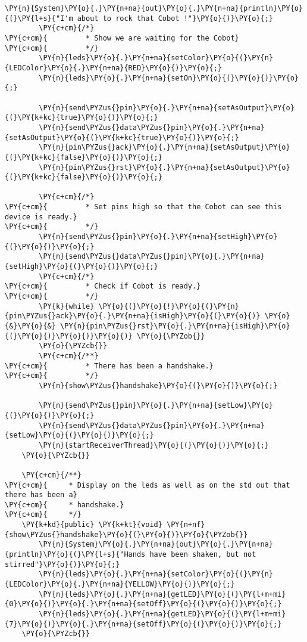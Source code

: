 \begin{Verbatim}[commandchars=\\\{\}]
        \PY{n}{System}\PY{o}{.}\PY{n+na}{out}\PY{o}{.}\PY{n+na}{println}\PY{o}{(}\PY{l+s}{"I'm about to rock that Cobot !"}\PY{o}{)}\PY{o}{;}
        \PY{c+cm}{/*}
\PY{c+cm}{         * Show we are waiting for the Cobot}
\PY{c+cm}{         */}
        \PY{n}{leds}\PY{o}{.}\PY{n+na}{setColor}\PY{o}{(}\PY{n}{LEDColor}\PY{o}{.}\PY{n+na}{RED}\PY{o}{)}\PY{o}{;}
        \PY{n}{leds}\PY{o}{.}\PY{n+na}{setOn}\PY{o}{(}\PY{o}{)}\PY{o}{;}

        \PY{n}{send\PYZus{}pin}\PY{o}{.}\PY{n+na}{setAsOutput}\PY{o}{(}\PY{k+kc}{true}\PY{o}{)}\PY{o}{;}
        \PY{n}{send\PYZus{}data\PYZus{}pin}\PY{o}{.}\PY{n+na}{setAsOutput}\PY{o}{(}\PY{k+kc}{true}\PY{o}{)}\PY{o}{;}
        \PY{n}{pin\PYZus{}ack}\PY{o}{.}\PY{n+na}{setAsOutput}\PY{o}{(}\PY{k+kc}{false}\PY{o}{)}\PY{o}{;}
        \PY{n}{pin\PYZus{}rst}\PY{o}{.}\PY{n+na}{setAsOutput}\PY{o}{(}\PY{k+kc}{false}\PY{o}{)}\PY{o}{;}

        \PY{c+cm}{/*}
\PY{c+cm}{         * Set pins high so that the Cobot can see this device is ready.}
\PY{c+cm}{         */}
        \PY{n}{send\PYZus{}pin}\PY{o}{.}\PY{n+na}{setHigh}\PY{o}{(}\PY{o}{)}\PY{o}{;}
        \PY{n}{send\PYZus{}data\PYZus{}pin}\PY{o}{.}\PY{n+na}{setHigh}\PY{o}{(}\PY{o}{)}\PY{o}{;}
        \PY{c+cm}{/*}
\PY{c+cm}{         * Check if Cobot is ready.}
\PY{c+cm}{         */}
        \PY{k}{while} \PY{o}{(}\PY{o}{!}\PY{o}{(}\PY{n}{pin\PYZus{}ack}\PY{o}{.}\PY{n+na}{isHigh}\PY{o}{(}\PY{o}{)} \PY{o}{&}\PY{o}{&} \PY{n}{pin\PYZus{}rst}\PY{o}{.}\PY{n+na}{isHigh}\PY{o}{(}\PY{o}{)}\PY{o}{)}\PY{o}{)} \PY{o}{\PYZob{}}
        \PY{o}{\PYZcb{}}
        \PY{c+cm}{/**}
\PY{c+cm}{         * There has been a handshake.}
\PY{c+cm}{         */}
        \PY{n}{show\PYZus{}handshake}\PY{o}{(}\PY{o}{)}\PY{o}{;}

        \PY{n}{send\PYZus{}pin}\PY{o}{.}\PY{n+na}{setLow}\PY{o}{(}\PY{o}{)}\PY{o}{;}
        \PY{n}{send\PYZus{}data\PYZus{}pin}\PY{o}{.}\PY{n+na}{setLow}\PY{o}{(}\PY{o}{)}\PY{o}{;}
        \PY{n}{startReceiverThread}\PY{o}{(}\PY{o}{)}\PY{o}{;}
    \PY{o}{\PYZcb{}}

    \PY{c+cm}{/**}
\PY{c+cm}{     * Display on the leds as well as on the std out that there has been a}
\PY{c+cm}{     * handshake.}
\PY{c+cm}{     */}
    \PY{k+kd}{public} \PY{k+kt}{void} \PY{n+nf}{show\PYZus{}handshake}\PY{o}{(}\PY{o}{)}\PY{o}{\PYZob{}}
        \PY{n}{System}\PY{o}{.}\PY{n+na}{out}\PY{o}{.}\PY{n+na}{println}\PY{o}{(}\PY{l+s}{"Hands have been shaken, but not stirred"}\PY{o}{)}\PY{o}{;}
        \PY{n}{leds}\PY{o}{.}\PY{n+na}{setColor}\PY{o}{(}\PY{n}{LEDColor}\PY{o}{.}\PY{n+na}{YELLOW}\PY{o}{)}\PY{o}{;}
        \PY{n}{leds}\PY{o}{.}\PY{n+na}{getLED}\PY{o}{(}\PY{l+m+mi}{0}\PY{o}{)}\PY{o}{.}\PY{n+na}{setOff}\PY{o}{(}\PY{o}{)}\PY{o}{;}
        \PY{n}{leds}\PY{o}{.}\PY{n+na}{getLED}\PY{o}{(}\PY{l+m+mi}{7}\PY{o}{)}\PY{o}{.}\PY{n+na}{setOff}\PY{o}{(}\PY{o}{)}\PY{o}{;}
    \PY{o}{\PYZcb{}}


\end{Verbatim}
